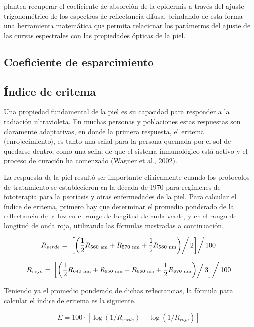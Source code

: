 		\cite{Narea} plantea recuperar el coeficiente de absorci\'{o}n de la epidermis a trav\'{e}s del ajuste trigonom\'{e}trico de los espectros de reflectancia difusa, brindando de esta forma una herramienta matem\'{a}tica que permita relacionar los par\'{a}metros del ajuste de las curvas espectrales con las propiedades \'{o}pticas de la piel.
	
	\subsection{Coeficiente de esparcimiento}
	
	\subsection{\'{I}ndice de eritema}
	
		Una propiedad fundamental de la piel es su capacidad para responder a la radiaci\'{o}n ultravioleta. En muchas personas y poblaciones estas respuestas son claramente adaptativas, en donde la primera respuesta, el eritema (enrojecimiento), es tanto una se\~{n}al para la persona quemada por el sol de quedarse dentro, como una se\~{n}al de que el sistema inmunol\'{o}gico est\'{a} activo y el proceso de curaci\'{o}n ha comenzado (Wagner et al., 2002). 
		
		La respuesta de la piel result\'{o} ser importante cl\'{i}nicamente cuando los protocolos de tratamiento se establecieron en la d\'{e}cada de 1970 para reg\'{i}menes de fototerapia para la psoriasis y otras enfermedades de la piel. Para calcular el \'{i}ndice de eritema, primero hay que determinar el promedio ponderado de la reflectancia de la luz en el rango de longitud de onda verde, y en el rango de longitud de onda roja, utilizando las f\'{o}rmulas mostradas a continuaci\'{o}n.

		$$R_{verde} = \left.\left.\left[\left(\frac{1}{2}R_{560 \text{ nm}} + R_{570 \text{ nm}} + \frac{1}{2}R_{580 \text{ nm}}\right)\right/2\right]\right/100$$
		
		$$R_{roja} = \left.\left.\left[\left(\frac{1}{2}R_{640 \text{ nm}} + R_{650 \text{ nm}} + R_{660 \text{ nm}} + \frac{1}{2}R_{670 \text{ nm}}\right)\right/3\right]\right/100$$
		
		Teniendo ya el promedio ponderado de dichas reflectancias, la f\'{o}rmula para calcular el \'{i}ndice de eritema es la siguiente.
		
		$$E = 100 \cdot [\log(1/R_{verde}) - \log(1/R_{roja})]$$
		
		